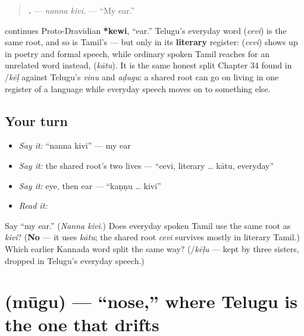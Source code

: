 \begin{quote}
\textbf{ .} — \emph{nanna kivi.} — \textquotedblleft{}My ear.\textquotedblright{}
\end{quote}

\begin{cousinweb}
\textbf{} continues Proto-Dravidian \textbf{*kewi}, \textquotedblleft{}ear.\textquotedblright{} Telugu's everyday word \textbf{} (\emph{cevi}) is the same root, and so is Tamil's — but only in its \textbf{literary} register: \textbf{} (\emph{cevi}) shows up in poetry and formal speech, while ordinary spoken Tamil reaches for an unrelated word instead, \textbf{} (\emph{kātu}). It is the same honest split Chapter 34 found in \textbf{}/\emph{kēḷ} against Telugu's \emph{vinu} and \emph{aḍugu}: a shared root can go on living in one register of a language while everyday speech moves on to something else.
\end{cousinweb}

\subsection*{Your turn}
\begin{itemize}
\raggedright
  \item \emph{Say it:} \textquotedblleft{}nanna kivi\textquotedblright{} — my ear
  \item \emph{Say it:} the shared root's two lives — \textquotedblleft{}cevi, literary … kātu, everyday\textquotedblright{}
  \item \emph{Say it:} eye, then ear — \textquotedblleft{}kaṇṇu … kivi\textquotedblright{}
  \item \emph{Read it:} \textbf{}
\end{itemize}

\begin{tcolorbox}[breakable,colback=teal!4,colframe=teal!35!black,title={Before you move on}]
Say \textquotedblleft{}my ear.\textquotedblright{} (\emph{Nanna kivi}.) Does everyday spoken Tamil use the same root as \emph{kivi}? (\textbf{No} — it uses \emph{kātu}; the shared root \emph{cevi} survives mostly in literary Tamil.) Which earlier Kannada word split the same way? (\emph{\textbf{}}/\emph{kēḷu} — kept by three sisters, dropped in Telugu's everyday speech.)
\end{tcolorbox}
\section[\texorpdfstring{\kn{ಮೂಗು} (mūgu)}{ಮೂಗು (mūgu)}]{ (mūgu) — \textquotedblleft{}nose,\textquotedblright{} where Telugu is the one that drifts}

